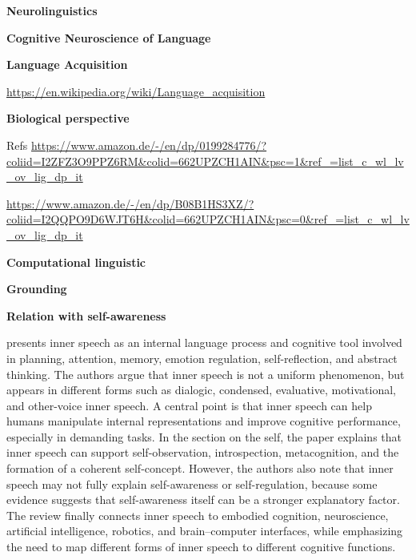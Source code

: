 \documentclass{book}
\providecommand{\ProjectDeepHeading}[2]{%
    \par\medskip\noindent\textbf{#2}\par\smallskip
}
\begin{document}
        \ProjectDeepHeading{7}{Neurolinguistics}
    
    
    \ProjectDeepHeading{6}{Cognitive Neuroscience of Language}
    
    
    \ProjectDeepHeading{6}{Language Acquisition}
        \url{https://en.wikipedia.org/wiki/Language_acquisition}


\ProjectDeepHeading{6}{Biological perspective}
Refs
\url{https://www.amazon.de/-/en/dp/0199284776/?coliid=I2ZFZ3O9PPZ6RM&colid=662UPZCH1AIN&psc=1&ref_=list_c_wl_lv_ov_lig_dp_it}
    
\url{https://www.amazon.de/-/en/dp/B08B1HS3XZ/?coliid=I2QQPO9D6WJT6H&colid=662UPZCH1AIN&psc=0&ref_=list_c_wl_lv_ov_lig_dp_it}


\ProjectDeepHeading{6}{Computational linguistic}


\ProjectDeepHeading{6}{Grounding}


\ProjectDeepHeading{6}{Relation with self-awareness}
        \cite{fernyhough-2023-inner-speech-as-language-process-and-cognitive-tool} presents inner speech as an internal language process and cognitive tool involved in planning, attention, memory, emotion regulation, self-reflection, and abstract thinking. The authors argue that inner speech is not a uniform phenomenon, but appears in different forms such as dialogic, condensed, evaluative, motivational, and other-voice inner speech. A central point is that inner speech can help humans manipulate internal representations and improve cognitive performance, especially in demanding tasks. In the section on the self, the paper explains that inner speech can support self-observation, introspection, metacognition, and the formation of a coherent self-concept. However, the authors also note that inner speech may not fully explain self-awareness or self-regulation, because some evidence suggests that self-awareness itself can be a stronger explanatory factor. The review finally connects inner speech to embodied cognition, neuroscience, artificial intelligence, robotics, and brain–computer interfaces, while emphasizing the need to map different forms of inner speech to different cognitive functions.
    
\end{document}
